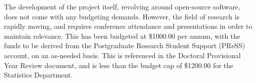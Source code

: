 The development of the project itself, revolving around open-source software, does not come with any budgeting demands.
However, the field of research is rapidly moving, and requires conference attendance and presentations in order to maintain relevance.
This has been budgeted at \$1000.00 per annum, with the funds to be derived from the Postgraduate Research Student Support (PReSS) account, on an as-needed basis.
This is referenced in the Doctoral Provisional Year Review document, and is less than the budget cap of \$1200.00 for the Statistics Department.
